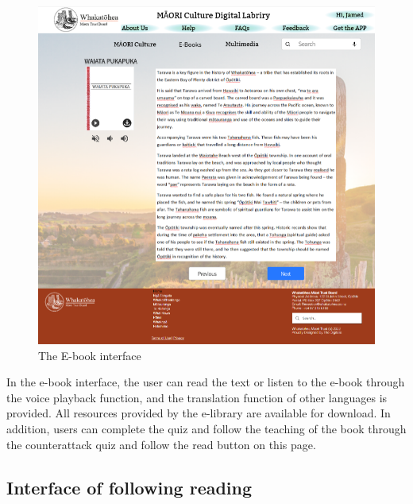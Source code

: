 \begin{figure}[htbp]
  \centerline{\includegraphics[width=400pt]{images/3-2-2.png}}
  \caption{The E-book interface}
  \label{fig30}
\end{figure}

In the e-book interface, the user can read the text or listen to the e-book through the voice playback function, and the translation function of other languages is provided. All resources provided by the e-library are available for download. In addition, users can complete the quiz and follow the teaching of the book through the counterattack quiz and follow the read button on this page.

\subsection{Interface of following reading }

